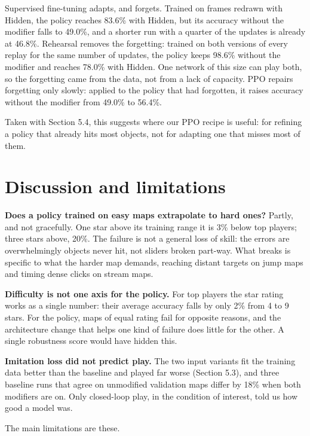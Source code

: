 \documentclass[10pt,a4paper]{article}
\begin{document}
Supervised fine-tuning adapts, and forgets. Trained on frames redrawn with Hidden, the policy reaches 83.6\% with Hidden, but its accuracy without the modifier falls to 49.0\%, and a shorter run with a quarter of the updates is already at 46.8\%. Rehearsal removes the forgetting: trained on both versions of every replay for the same number of updates, the policy keeps 98.6\% without the modifier and reaches 78.0\% with Hidden. One network of this size can play both, so the forgetting came from the data, not from a lack of capacity. PPO repairs forgetting only slowly: applied to the policy that had forgotten, it raises accuracy without the modifier from 49.0\% to 56.4\%.


Taken with Section 5.4, this suggests where our PPO recipe is useful: for refining a policy that already hits most objects, not for adapting one that misses most of them.


\section{Discussion and limitations}

\textbf{Does a policy trained on easy maps extrapolate to hard ones?} Partly, and not gracefully. One star above its training range it is 3\% below top players; three stars above, 20\%. The failure is not a general loss of skill: the errors are overwhelmingly objects never hit, not sliders broken part-way. What breaks is specific to what the harder map demands, reaching distant targets on jump maps and timing dense clicks on stream maps.


\textbf{Difficulty is not one axis for the policy.} For top players the star rating works as a single number: their average accuracy falls by only 2\% from 4 to 9 stars. For the policy, maps of equal rating fail for opposite reasons, and the architecture change that helps one kind of failure does little for the other. A single robustness score would have hidden this.


\textbf{Imitation loss did not predict play.} The two input variants fit the training data better than the baseline and played far worse (Section 5.3), and three baseline runs that agree on unmodified validation maps differ by 18\% when both modifiers are on. Only closed-loop play, in the condition of interest, told us how good a model was.


The main limitations are these.
\end{document}
